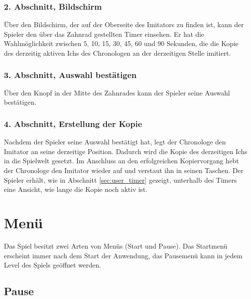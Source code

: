 \subsubsection{2. Abschnitt, Bildschirm}
Über den Bildschirm, der auf der Oberseite des Imitators zu finden ist, kann der Spieler den über das Zahnrad gestellten Timer einsehen. Er hat die Wahlmöglichkeit zwischen 5, 10, 15, 30, 45, 60 und 90 Sekunden, die die Kopie des derzeitig aktiven Ichs des Chronologen an der derzeitigen Stelle imitiert. 

\subsubsection{3. Abschnitt, Auswahl bestätigen}
Über den Knopf in der Mitte des Zahnrades kann der Spieler seine Auswahl bestätigen.

\subsubsection{4. Abschnitt, Erstellung der Kopie}
Nachdem der Spieler seine Auswahl bestätigt hat, legt der Chronologe den Imitator an seine derzeitige Position. Dadurch wird die Kopie des derzeitigen Ichs in die Spielwelt gesetzt. Im Anschluss an den erfolgreichen Kopiervorgang hebt der Chronologe den Imitator wieder auf und verstaut ihn in seinen Taschen. Der Spieler erhält, wie in Abschnitt \ref{sec:user_timer}  gezeigt, unterhalb des Timers eine Ansicht, wie lange die Kopie noch aktiv ist.
\newpage
\section{Menü}
Das Spiel besitzt zwei Arten von Menüs (Start und Pause). Das Startmenü erscheint immer nach dem Start der Anwendung, das Pausemenü kann in jedem Level des Spiels geöffnet werden. 

\subsection{Pause}

